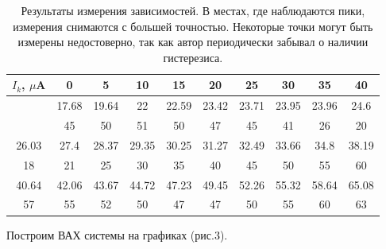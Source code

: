 \documentclass[a4paper, 14pt]{extarticle}%
\newcommand\ECaption[1]{%
     \captionsetup{font=footnotesize}%
     \caption{#1}}
\begin{document}
\begin{table}[h]
\begin{center}
\begin{tabular}{|c|c|c|c|c|c|c|c|c|c|}
\rowcolor[HTML]{FFFFFF} 
$I_k$, $\mu$A & 0     & 5     & 10    & 15    & 20    & 25    & 30    & 35    & 40    \\ \hline
\rowcolor[HTML]{9698ED} 
              & 17.68 & 19.64 & 22    & 22.59 & 23.42 & 23.71 & 23.95 & 23.96 & 24.6  \\ \hline
\rowcolor[HTML]{FFFFFF} 
              & 45    & 50    & 51    & 50    & 47    & 45    & 41    & 26    & 20    \\ \hline
\rowcolor[HTML]{9698ED} 
26.03         & 27.4  & 28.37 & 29.35 & 30.25 & 31.27 & 32.49 & 33.66 & 34.8  & 38.19 \\ \hline
\rowcolor[HTML]{FFFFFF} 
18            & 21    & 25    & 30    & 35    & 40    & 45    & 50    & 55    & 60    \\ \hline
\rowcolor[HTML]{9698ED} 
40.64         & 42.06 & 43.67 & 44.72 & 47.23 & 49.45 & 52.26 & 55.32 & 58.64 & 65.08 \\ \hline
\rowcolor[HTML]{FFFFFF} 
57            & 55    & 52    & 50    & 47    & 47    & 50    & 55    & 60    & 63    \\ \hline
\end{tabular}
\ECaption{Результаты измерения зависимостей. В местах, где наблюдаются пики, измерения снимаются с большей точностью. Некоторые точки могут быть измерены недостоверно, так как автор периодически забывал о наличии гистерезиса.}
\end{center}
\end{table}

Построим ВАХ системы на графиках (рис.3).
\end{document}
